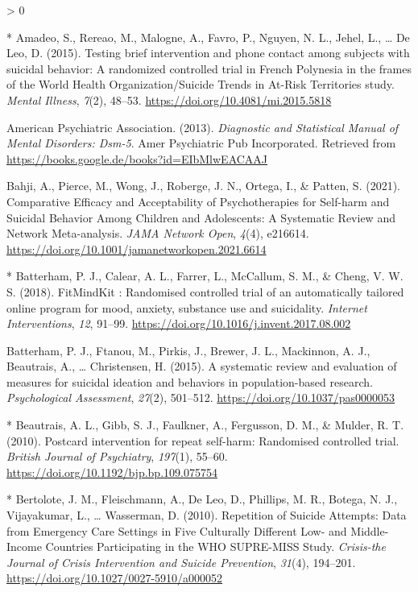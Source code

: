 \documentclass[
  english,
  man]{apa6}
\newlength{\cslhangindent}
\newenvironment{CSLReferences}[2] %
 {%
  \setlength{\parindent}{0pt}
  \ifodd #1 \everypar{\setlength{\hangindent}{\cslhangindent}}\ignorespaces\fi
  \ifnum #2 > 0
  \setlength{\parskip}{#2\baselineskip}
  \fi
 }%
 {}
\begin{document}
\hypertarget{refs}{}
\begin{CSLReferences}{1}{0}
\leavevmode\hypertarget{ref-amadeo2015}{}%
* Amadeo, S., Rereao, M., Malogne, A., Favro, P., Nguyen, N. L., Jehel, L., \ldots{} De Leo, D. (2015). Testing brief intervention and phone contact among subjects with suicidal behavior: A randomized controlled trial in {French Polynesia} in the frames of the {World Health Organization}/{Suicide Trends} in {At}-{Risk Territories} study. \emph{Mental Illness}, \emph{7}(2), 48--53. \url{https://doi.org/10.4081/mi.2015.5818}

\leavevmode\hypertarget{ref-americanpsychiatricassociation2013a}{}%
American Psychiatric Association. (2013). \emph{Diagnostic and {Statistical Manual} of {Mental Disorders}: Dsm-5}. {Amer Psychiatric Pub Incorporated}. Retrieved from \url{https://books.google.de/books?id=EIbMlwEACAAJ}

\leavevmode\hypertarget{ref-bahji2021}{}%
Bahji, A., Pierce, M., Wong, J., Roberge, J. N., Ortega, I., \& Patten, S. (2021). Comparative {Efficacy} and {Acceptability} of {Psychotherapies} for {Self}-harm and {Suicidal Behavior Among Children} and {Adolescents}: A {Systematic Review} and {Network Meta}-analysis. \emph{JAMA Network Open}, \emph{4}(4), e216614. \url{https://doi.org/10.1001/jamanetworkopen.2021.6614}

\leavevmode\hypertarget{ref-batterham2018}{}%
* Batterham, P. J., Calear, A. L., Farrer, L., McCallum, S. M., \& Cheng, V. W. S. (2018). {FitMindKit} : Randomised controlled trial of an automatically tailored online program for mood, anxiety, substance use and suicidality. \emph{Internet Interventions}, \emph{12}, 91--99. \url{https://doi.org/10.1016/j.invent.2017.08.002}

\leavevmode\hypertarget{ref-batterham2015}{}%
Batterham, P. J., Ftanou, M., Pirkis, J., Brewer, J. L., Mackinnon, A. J., Beautrais, A., \ldots{} Christensen, H. (2015). A systematic review and evaluation of measures for suicidal ideation and behaviors in population-based research. \emph{Psychological Assessment}, \emph{27}(2), 501--512. \url{https://doi.org/10.1037/pas0000053}

\leavevmode\hypertarget{ref-beautrais2010}{}%
* Beautrais, A. L., Gibb, S. J., Faulkner, A., Fergusson, D. M., \& Mulder, R. T. (2010). Postcard intervention for repeat self-harm: Randomised controlled trial. \emph{British Journal of Psychiatry}, \emph{197}(1), 55--60. \url{https://doi.org/10.1192/bjp.bp.109.075754}

\leavevmode\hypertarget{ref-bertolote2010}{}%
* Bertolote, J. M., Fleischmann, A., De Leo, D., Phillips, M. R., Botega, N. J., Vijayakumar, L., \ldots{} Wasserman, D. (2010). Repetition of {Suicide Attempts}: Data from {Emergency Care Settings} in {Five Culturally Different Low}- and {Middle}-{Income Countries Participating} in the {WHO SUPRE}-{MISS Study}. \emph{Crisis-the Journal of Crisis Intervention and Suicide Prevention}, \emph{31}(4), 194--201. \url{https://doi.org/10.1027/0027-5910/a000052}


\end{CSLReferences}
\end{document}
